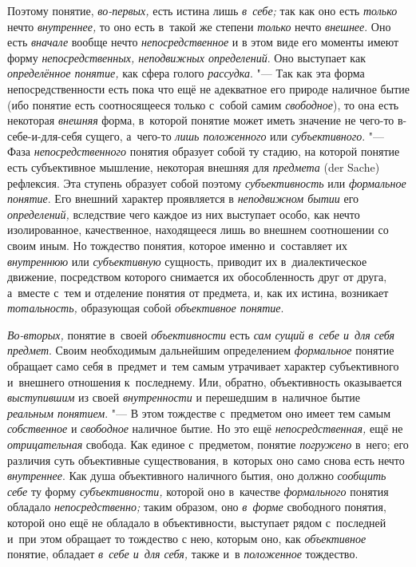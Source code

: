 Поэтому понятие, {\em во-первых,} есть истина лишь {\em в~себе;}
так как оно есть {\em только} нечто {\em внутреннее,} то оно
есть в~такой же степени {\em только} нечто {\em внешнее}.
Оно есть {\em вначале} вообще нечто {\em непосредственное} и
в этом виде его моменты имеют форму {\em непосредственных, неподвижных
определений}. Оно выступает как {\em определённое понятие,}
как сфера голого {\em рассудка}. "--- Так как
эта форма непосредственности есть пока что ещё не адекватное его природе
наличное бытие (ибо понятие есть соотносящееся только с~собой самим
{\em свободное}), то она есть некоторая {\em внешняя}
форма, в~которой понятие может иметь значение не чего-то
в-себе-и-для-себя сущего, а~чего-то {\em лишь положенного}
или {\em субъективного}. "--- Фаза {\em непосредственного}
понятия образует собой ту стадию, на которой понятие есть
субъективное мышление, некоторая внешняя для {\em предмета} (der Sache)
рефлексия. Эта ступень образует собой поэтому {\em субъективность} или
{\em формальное понятие}. Его внешний характер проявляется в
{\em неподвижном бытии} его {\em определений,}
вследствие чего каждое из них выступает особо, как нечто
изолированное, качественное, находящееся лишь во внешнем соотношении со
своим иным. Но тождество понятия, которое именно и~составляет их
{\em внутреннюю} или {\em субъективную}
сущность, приводит их в~диалектическое движение, посредством
которого снимается их обособленность друг от друга, а~вместе с~тем и
отделение понятия от предмета, и, как их истина, возникает
{\em тотальность,} образующая собой {\em объективное понятие}.

{\em Во-вторых,} понятие в~своей {\em объективности}
есть {\em сам сущий в~себе и~для себя предмет}. Своим необходимым дальнейшим
определением {\em формальное}
понятие обращает само себя в~предмет и~тем самым утрачивает
характер субъективного и~внешнего отношения к~последнему. Или, обратно,
объективность оказывается {\em выступившим} из своей {\em внутренности}
и перешедшим в~наличное бытие {\em реальным понятием}. "---
В этом тождестве с~предметом оно имеет тем самым {\em собственное} и
{\em свободное} наличное бытие. Но это ещё {\em непосредственная,}
ещё не {\em отрицательная} свобода. Как единое с~предметом, понятие
{\em погружено} в~него;
его различия суть объективные существования, в~которых оно само снова есть
нечто {\em внутреннее}. Как душа объективного наличного бытия, оно должно
{\em сообщить себе} ту форму {\em субъективности,} которой оно в~качестве
{\em формального} понятия обладало {\em непосредственно;} таким образом, оно
{\em в~форме} свободного понятия, которой оно ещё не обладало в
объективности, выступает рядом с~последней и~при этом обращает то тождество
с нею, которым оно, как {\em объективное} понятие, обладает
{\em в~себе и~для себя,} также и~в {\em положенное} тождество.

